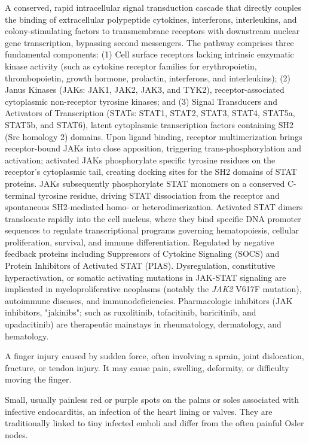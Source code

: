  A conserved, rapid intracellular signal transduction cascade that directly couples the binding of extracellular polypeptide cytokines, interferons, interleukins, and colony-stimulating factors to transmembrane receptors with downstream nuclear gene transcription, bypassing second messengers. The pathway comprises three fundamental components: (1) Cell surface receptors lacking intrinsic enzymatic kinase activity (such as cytokine receptor families for erythropoietin, thrombopoietin, growth hormone, prolactin, interferons, and interleukins); (2) Janus Kinases (JAKs: JAK1, JAK2, JAK3, and TYK2), receptor-associated cytoplasmic non-receptor tyrosine kinases; and (3) Signal Transducers and Activators of Transcription (STATs: STAT1, STAT2, STAT3, STAT4, STAT5a, STAT5b, and STAT6), latent cytoplasmic transcription factors containing SH2 (Src homology 2) domains. Upon ligand binding, receptor multimerization brings receptor-bound JAKs into close apposition, triggering trans-phosphorylation and activation; activated JAKs phosphorylate specific tyrosine residues on the receptor's cytoplasmic tail, creating docking sites for the SH2 domains of STAT proteins. JAKs subsequently phosphorylate STAT monomers on a conserved C-terminal tyrosine residue, driving STAT dissociation from the receptor and spontaneous SH2-mediated homo- or heterodimerization. Activated STAT dimers translocate rapidly into the cell nucleus, where they bind specific DNA promoter sequences to regulate transcriptional programs governing hematopoiesis, cellular proliferation, survival, and immune differentiation. Regulated by negative feedback proteins including Suppressors of Cytokine Signaling (SOCS) and Protein Inhibitors of Activated STAT (PIAS). Dysregulation, constitutive hyperactivation, or somatic activating mutations in JAK-STAT signaling are implicated in myeloproliferative neoplasms (notably the \textit{JAK2} V617F mutation), autoimmune diseases, and immunodeficiencies. Pharmacologic inhibitors (JAK inhibitors, "jakinibs"; such as ruxolitinib, tofacitinib, baricitinib, and upadacitinib) are therapeutic mainstays in rheumatology, dermatology, and hematology.

 A finger injury caused by sudden force, often involving a sprain, joint dislocation, fracture, or tendon injury. It may cause pain, swelling, deformity, or difficulty moving the finger.

 Small, usually painless red or purple spots on the palms or soles associated with infective endocarditis, an infection of the heart lining or valves. They are traditionally linked to tiny infected emboli and differ from the often painful Osler nodes.

